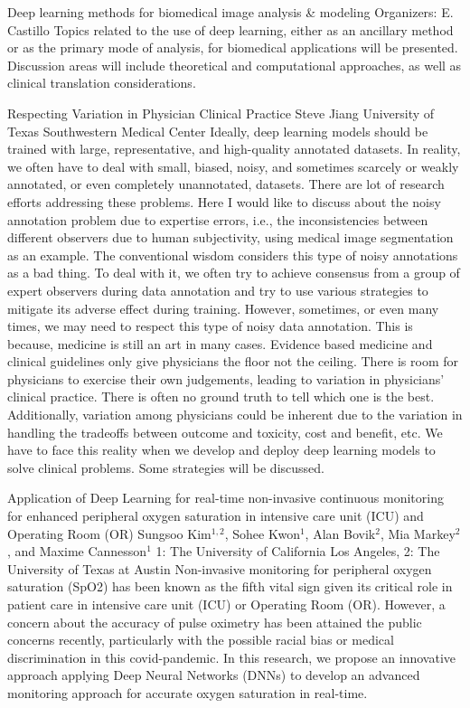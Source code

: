 \label{mini05}

\miniabs
{Deep learning methods for biomedical image analysis \& modeling}
{Organizers: E. Castillo}
{Topics related to the use of deep learning, either as an ancillary method or as the primary mode of analysis, for biomedical applications will be presented. Discussion areas will include theoretical and computational approaches, as well as clinical translation considerations.}

\vspace{2ex}
\abs
{Respecting Variation in Physician Clinical Practice }
{Steve Jiang}
{University of Texas Southwestern Medical Center}
{Ideally, deep learning models should be trained with large, representative, and high-quality annotated datasets. In reality, we often have to deal with small, biased, noisy, and sometimes scarcely or weakly annotated, or even completely unannotated, datasets. There are lot of research efforts addressing these problems. Here I would like to discuss about the noisy annotation problem due to expertise errors, i.e., the inconsistencies between different observers due to human subjectivity, using medical image segmentation as an example. The conventional wisdom considers this type of noisy annotations as a bad thing. To deal with it, we often try to achieve consensus from a group of expert observers during data annotation and try to use various strategies to mitigate its adverse effect during training. However, sometimes, or even many times, we may need to respect this type of noisy data annotation. This is because, medicine is still an art in many cases. Evidence based medicine and clinical guidelines only give physicians the floor not the ceiling. There is room for physicians to exercise their own judgements, leading to variation in physicians’ clinical practice. There is often no ground truth to tell which one is the best. Additionally, variation among physicians could be inherent due to the variation in handling the tradeoffs between outcome and toxicity, cost and benefit, etc. We have to face this reality when we develop and deploy deep learning models to solve clinical problems. Some strategies will be discussed.}


\vspace{1.5ex}
\abs
{Application of Deep Learning for real-time non-invasive continuous monitoring for enhanced peripheral oxygen saturation in intensive care unit (ICU) and Operating Room (OR)}
{Sungsoo Kim$^{1,2}$, Sohee Kwon$^{1}$, Alan Bovik$^{2}$, Mia Markey$^{2}$, and Maxime Cannesson$^{1}$}
{1: The University of California Los Angeles, 2: The University of Texas at Austin}
{Non-invasive monitoring for peripheral oxygen saturation (SpO2) has been known as the fifth vital sign given its critical role in patient care in intensive care unit (ICU) or Operating Room (OR). However, a concern about the accuracy of pulse oximetry has been attained the public concerns recently, particularly with the possible racial bias or medical discrimination in this covid-pandemic. In this research, we propose an innovative approach applying Deep Neural Networks (DNNs) to develop an advanced monitoring approach for accurate oxygen saturation in real-time.}


